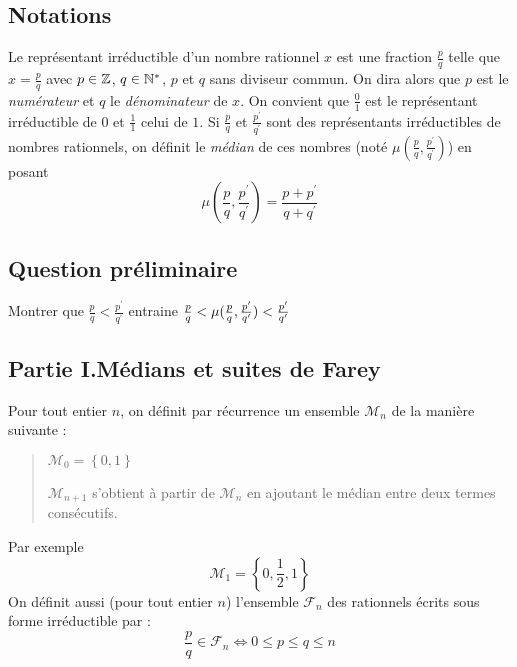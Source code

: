 \subsection*{Notations}

Le repr{\'e}sentant irr{\'e}ductible d'un nombre rationnel $x$ est une fraction $\frac{p}{q}$ telle que $x=\frac{p}{q}$ avec $p\in \mathbb{Z}$, $q\in \mathbb{N}^{*}$, $p$ et $q$ sans diviseur commun. On dira alors que $p$ est le \emph{num{\'e}rateur }et $q$ le \emph{d{\'e}nominateur }de $x$.
\newline
On convient que $\frac{0}{1}$ est le repr{\'e}sentant irr{\'e}ductible de $0$ et $\frac{1}{1}$ celui de $1$.\newline
Si $\frac{p}{q}$ et $\frac{p^{\prime }}{q^{\prime }}$ sont des repr{\'e}sentants irr{\'e}ductibles de nombres rationnels, on d{\'e}finit le \emph{m{\'e}dian} de ces nombres (not{\'e} $\mu (\frac{p}{q},\frac{p^{\prime}}{q^{\prime }})$) en posant
\begin{displaymath}
 \mu (\frac{p}{q},\frac{p^{\prime }}{q^{\prime }})=\frac{p+p^{\prime }}{q+q^{\prime }}
\end{displaymath}

\subsection*{Question pr{\'e}liminaire}
Montrer que $\frac{p}{q}<\frac{p^{\prime }}{q^{\prime }}$ entraine $\frac{p}{q}<\mu (\frac{p}{q},\frac{p^{\prime }}{q^{\prime }})<\frac{%
p^{\prime }}{q^{\prime }}$

\subsection*{Partie I.\quad M{\'e}dians et suites de Farey}
Pour tout entier $n$, on d{\'e}finit par r{\'e}currence un ensemble $\mathcal{M}_{n}$ de la mani{\`e}re suivante :

\begin{quote}
$\mathcal{M}_{0}=\left\{ 0,1\right\}$

$\mathcal{M}_{n+1}$ s'obtient à partir de $\mathcal{M}_{n}$ en ajoutant le m{\'e}dian entre deux termes cons{\'e}cutifs.
\end{quote}
Par exemple 
\begin{displaymath}
 \mathcal{M}_{1}=\left\{ 0,\frac{1}{2},1\right\}
\end{displaymath}
On d{\'e}finit aussi (pour tout entier $n$) l'ensemble $\mathcal{F}_{n}$ des rationnels écrits sous forme irréductible par :
\begin{displaymath}
 \frac{p}{q} \in \mathcal{F}_{n} \Leftrightarrow 0\leq p\leq q\leq n
\end{displaymath}

